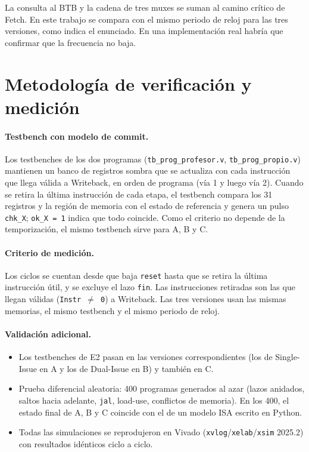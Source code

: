 \documentclass[11pt,a4paper]{article}
\newcommand{\sig}[1]{\texttt{#1}}
\begin{document}
La consulta al BTB y la cadena de tres muxes se suman al camino crítico de Fetch. En este trabajo se compara con el mismo periodo de reloj para las tres versiones, como indica el enunciado. En una implementación real habría que confirmar que la frecuencia no baja.

\section{Metodología de verificación y medición}

\paragraph{Testbench con modelo de commit.} Los testbenches de los dos programas (\sig{tb\_prog\_profesor.v}, \sig{tb\_prog\_propio.v}) mantienen un banco de registros sombra que se actualiza con cada instrucción que llega válida a Writeback, en orden de programa (vía 1 y luego vía 2). Cuando se retira la última instrucción de cada etapa, el testbench compara los 31 registros y la región de memoria con el estado de referencia y genera un pulso \sig{chk\_X}; \sig{ok\_X~=~1} indica que todo coincide. Como el criterio no depende de la temporización, el mismo testbench sirve para A, B y C.

\paragraph{Criterio de medición.} Los ciclos se cuentan desde que baja \sig{reset} hasta que se retira la última instrucción útil, y se excluye el lazo \sig{fin}. Las instrucciones retiradas son las que llegan válidas (\sig{Instr~$\neq$~0}) a Writeback. Las tres versiones usan las mismas memorias, el mismo testbench y el mismo periodo de reloj.

\paragraph{Validación adicional.}
\begin{itemize}[nosep]
  \item Los testbenches de E2 pasan en las versiones correspondientes (los de Single-Issue en A y los de Dual-Issue en B) y también en C.
  \item Prueba diferencial aleatoria: 400 programas generados al azar (lazos anidados, saltos hacia adelante, \sig{jal}, load-use, conflictos de memoria). En los 400, el estado final de A, B y C coincide con el de un modelo ISA escrito en Python.
  \item Todas las simulaciones se reprodujeron en Vivado (\sig{xvlog}/\sig{xelab}/\sig{xsim} 2025.2) con resultados idénticos ciclo a ciclo.
\end{itemize}
\end{document}
